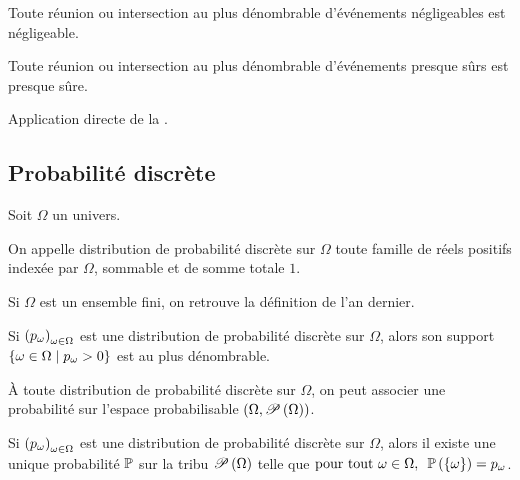 \begin{prop}
Toute réunion ou intersection au plus dénombrable d'événements négligeables est négligeable.

Toute réunion ou intersection au plus dénombrable d'événements presque sûrs est presque sûre.
\end{prop}

\begin{dem}
Application directe de la .
\end{dem}

\subsection{Probabilité discrète}

\begin{defi}
Soit \(\Omega\) un univers.

On appelle distribution de probabilité discrète sur \(\Omega\) toute famille de réels positifs indexée par \(\Omega\), sommable et de somme totale \(1\).

Si \(\Omega\) est un ensemble fini, on retrouve la définition de l'an dernier.
\end{defi}

\begin{prop}
Si \(\paren{p_\omega}_{\omega\in\Omega}\) est une distribution de probabilité discrète sur \(\Omega\), alors son support \(\accol{\omega\in\Omega\tq p_\omega>0}\) est au plus dénombrable.
\end{prop}

À toute distribution de probabilité discrète sur \(\Omega\), on peut associer une probabilité sur l'espace probabilisable \(\groupe{\Omega}[\P{\Omega}]\).

\begin{prop}
Si \(\paren{p_\omega}_{\omega\in\Omega}\) est une distribution de probabilité discrète sur \(\Omega\), alors il existe une unique probabilité \(\prem\) sur la tribu \(\P{\Omega}\) telle que \(\quantifs{\tpt\omega\in\Omega}\proba{\accol{\omega}}=p_\omega\).
\end{prop}

